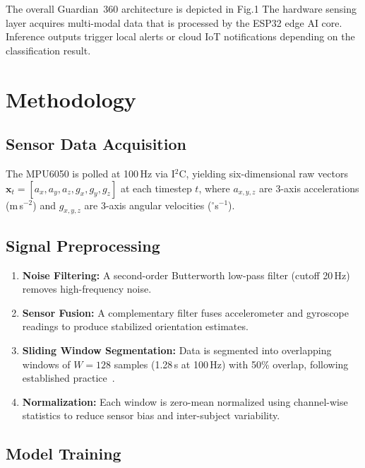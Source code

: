 \documentclass[conference]{IEEEtran}
\begin{document}
The overall Guardian~360 architecture is depicted in Fig.1
The hardware sensing layer acquires multi-modal data that is processed by
the ESP32 edge AI core. Inference outputs trigger local alerts or cloud IoT
notifications depending on the classification result.


\section{Methodology}
\label{sec:method}

\subsection{Sensor Data Acquisition}

The MPU6050 is polled at 100\,Hz via I$^2$C, yielding six-dimensional raw
vectors $\mathbf{x}_t = [a_x, a_y, a_z, g_x, g_y, g_z]$ at each timestep
$t$, where $a_{x,y,z}$ are 3-axis accelerations (m\,s$^{-2}$) and
$g_{x,y,z}$ are 3-axis angular velocities ($^\circ$s$^{-1}$).



\subsection{Signal Preprocessing}

\begin{enumerate}
  \item \textbf{Noise Filtering:} A second-order Butterworth low-pass
        filter (cutoff 20\,Hz) removes high-frequency noise.
  \item \textbf{Sensor Fusion:} A complementary filter fuses accelerometer
        and gyroscope readings to produce stabilized orientation estimates.
  \item \textbf{Sliding Window Segmentation:} Data is segmented into
        overlapping windows of $W = 128$ samples (1.28\,s at 100\,Hz) with
        50\% overlap, following established practice~\cite{attal2015}.
  \item \textbf{Normalization:} Each window is zero-mean normalized using
        channel-wise statistics to reduce sensor bias and inter-subject
        variability.
\end{enumerate}

\subsection{Model Training}
\end{document}
